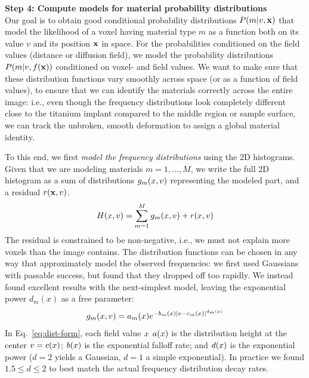 \vspace{\baselineskip}
\noindent\textbf{Step 4: Compute models for material probability distributions} \\
Our goal is to obtain good conditional probability distributions $P\!\left(m\middle\vert v,\mathbf{x}\right)$
that model the likelihood of a voxel having material type $m$ as a function
both on its value $v$ and its position $\mathbf{x}$ in space. For the probabilities
conditioned on the field values (distance or diffusion field), we model
the probability distributions $P\!\left(m\middle\vert v,f(\mathbf{x})\right)$ conditioned on
voxel- and field values. We want to make sure that these distribution
functions vary smoothly across space (or as a function of field values),
to ensure that we can identify the materials correctly across the entire
image: i.e., even though the frequency distributions look completely different
close to the titanium implant compared to the middle region or sample surface,
we can track the unbroken, smooth deformation to assign a global material
identity.

To this end, we first {\it model the frequency distributions} using the
2D histograms. Given that we are modeling materials $m=1,\ldots,M$,
we write the full 2D histogram as a sum of distributions
$g_m(x,v)$ representing the modeled part, and a
residual $r(\mathbf{x},v)$.
\begin{equation}
  \label{eq:hist}
  H(x,v) = \sum_{m=1}^M g_m(x,v) + r(x,v)
\end{equation}
The residual is constrained to be non-negative, i.e., we must not explain
more voxels than the image contains.
The distribution functions can be chosen in any way that approximately
model the observed frequencies: we first used Gaussians with passable success,
but found that they dropped off too rapidly. We instead found excellent results
with the next-simplest model, leaving the exponential power $d_m(x)$ as a free parameter:
\begin{equation}
  \label{eq:dist-form}
  g_m(x,v) = a_m(x) e^{-b_m(x) \vert v-c_m(x)\vert^{d_m(x)}}
\end{equation}
In Eq.~\eqref{eq:dist-form}, each field value $x$
$a(x)$ is the distribution height at the center $v=c(x)$;
$b(x)$ is the exponential falloff rate; and $d(x)$ is
the exponential power ($d=2$ yields a Gaussian, $d=1$ a simple exponential).
In practice we found $1.5\le d \le 2$ to best match the actual frequency
distribution decay rates.

